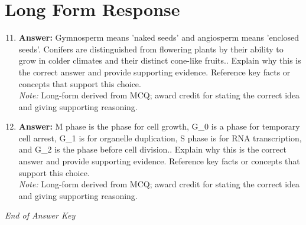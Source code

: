 \documentclass[12pt]{article}
\begin{document}
\section*{Long Form Response}
\begin{enumerate}[label=\arabic*.]
\setcounter{enumi}{10}
\item \textbf{Answer:} Gymnosperm means 'naked seeds' and angiosperm means 'enclosed seeds'. Conifers are distinguished from flowering plants by their ability to grow in colder climates and their distinct cone-like fruits.. Explain why this is the correct answer and provide supporting evidence. Reference key facts or concepts that support this choice.
\\ \textit{Note:} Long-form derived from MCQ; award credit for stating the correct idea and giving supporting reasoning.
\item \textbf{Answer:} M phase is the phase for cell growth, G\_0 is a phase for temporary cell arrest, G\_1 is for organelle duplication, S phase is for RNA transcription, and G\_2 is the phase before cell division.. Explain why this is the correct answer and provide supporting evidence. Reference key facts or concepts that support this choice.
\\ \textit{Note:} Long-form derived from MCQ; award credit for stating the correct idea and giving supporting reasoning.
\end{enumerate}

\vfill
\noindent\textit{End of Answer Key}
\end{document}
